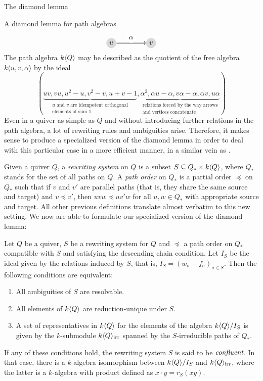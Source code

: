 \begin{chapter}{The diamond lemma}
\begin{section}{A diamond lemma for path algebras}
\[
\begin{tikzpicture}[->,node distance=1cm, thick]
\tikzstyle{every node} = [circle, fill=gray!30, minimum size=.5cm, inner sep=.07cm]
\node (1) at (0,0) {$u$};
\node (2) at (2,0) {$v$};
\draw (1) -- (2) node[midway, above, fill=white] {$\alpha$};
\end{tikzpicture}
\]
The path algebra $k\langle Q\rangle$ may be described as the quotient of the free algebra $k\langle u,v,\alpha\rangle$ by the ideal
\[(\underbrace{uv, vu, u^2-u, v^2-v, u+v-1}_{\substack{\text{$u$ and $v$ are idempotent orthogonal}\\\text{elements of sum $1$}}}, \underbrace{\alpha^2, \alpha u-\alpha, v\alpha-\alpha, \alpha v,u\alpha }_{\substack{\text{relations forced by the way arrows}\\\text{and vertices concatenate}}})\]
Even in a quiver as simple as $Q$ and without introducing further relations in the path algebra, a lot of rewriting rules and ambiguities arise. Therefore, it makes sense to produce a specialized version of the diamond lemma in order to deal with this particular case in a more efficient manner, in a similar vein as \cite{FFG93}.

Given a quiver $Q$, a \emph{rewriting system} on $Q$ is a subset $S\subseteq Q_*\times k\langle Q\rangle$, where $Q_*$ stands for the set of all paths on $Q$. A \emph{path order} on $Q_*$ is a partial order $\preceq$ on $Q_*$ such that if $v$ and $v'$ are parallel paths (that is, they share the same source and target) and $v\preceq v'$, then $uvw\preceq uv'w$ for all $u,w\in Q_*$ with appropriate source and target. All other previous definitions translate almost verbatim to this new setting. We now are able to formulate our specialized version of the diamond lemma:

\begin{thm}\label{quiver-diamond-lemma} Let $Q$ be a quiver, $S$ be a rewriting system for $Q$ and $\preceq$ a path order on $Q_*$ compatible with $S$ and satisfying the descending chain condition. Let $I_S$ be the ideal given by the relations induced by $S$, that is, $I_S=(w_\sigma-f_\sigma)_{\sigma\in S}$. Then the following conditions are equivalent:
\begin{enumerate}
\item All ambiguities of $S$ are resolvable.
\item All elements of $k\langle Q\rangle$ are reduction-unique under $S$.
\item A set of representatives in $k\langle Q\rangle$ for the elements of the algebra $k\langle Q\rangle/I_S$ is given by the $k$-submodule $k\langle Q\rangle_{\mathrm{irr}}$ spanned by the $S$-irreducible paths of $Q_*$.
\end{enumerate}
If any of these conditions hold, the rewriting system $S$ is said to be $\emph{confluent}$. In that case, there is a $k$-algebra isomorphism between $k\langle Q\rangle/I_S$ and $k\langle Q\rangle_{\mathrm{irr}}$, where the latter is a $k$-algebra with product defined as $x\cdot y= r_S(xy)$.
\end{thm}


\end{section}
\end{chapter}
